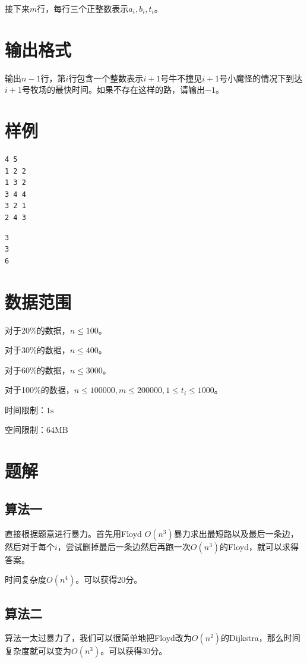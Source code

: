 \documentclass[11pt, a4paper]{article}
\begin{document}
接下来$m$行，每行三个正整数表示$a_i, b_i, t_i$。

\section*{输出格式}
输出$n - 1$行，第$i$行包含一个整数表示$i + 1$号牛不撞见$i + 1$号小魔怪的情况下到达$i + 1$号牧场的最快时间。如果不存在这样的路，请输出$-1$。

\section*{样例}
\begin{Verbatim}[frame=single, label=input]
4 5
1 2 2
1 3 2
3 4 4
3 2 1
2 4 3

\end{Verbatim}

\begin{Verbatim}[frame=single, label=output]
3
3
6

\end{Verbatim}

\section*{数据范围}
对于20\%的数据，$n \leq 100$。

对于30\%的数据，$n \leq 400$。

对于60\%的数据，$n \leq 3000$。

对于100\%的数据，$n \leq 100000, m \leq 200000, 1 \leq t_i \leq 1000$。

时间限制：$1\text{s}$

空间限制：$64\text{MB}$

\section*{题解}
\subsection*{算法一}
直接根据题意进行暴力。首先用Floyd $O(n^3)$暴力求出最短路以及最后一条边，然后对于每个$i$，尝试删掉最后一条边然后再跑一次$O(n^3)$的Floyd，就可以求得答案。

时间复杂度$O(n^4)$。可以获得20分。

\subsection*{算法二}
算法一太过暴力了，我们可以很简单地把Floyd改为$O(n^2)$的Dijkstra，那么时间复杂度就可以变为$O(n^3)$。可以获得30分。
\end{document}
